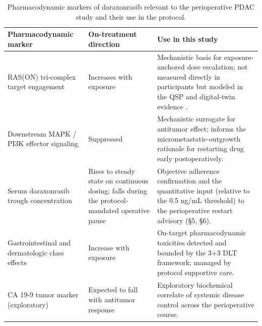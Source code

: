\begin{table}[t]
\centering
\caption{Pharmacodynamic markers of daraxonrasib relevant to the perioperative
PDAC study and their use in the protocol.}
\label{tab:sec07-pd}
\begin{tabularx}{\textwidth}{L{3.7cm} L{2.4cm} Y}
\toprule
\textbf{Pharmacodynamic marker} & \textbf{On-treatment direction} & \textbf{Use in this study} \\
\midrule
RAS(ON) tri-complex target engagement & Increases with exposure & Mechanistic basis for exposure-anchored dose escalation; not measured directly in participants but modeled in the QSP and digital-twin evidence \cite{qspmetpancre}. \\
Downstream MAPK / PI3K effector signaling & Suppressed & Mechanistic surrogate for antitumor effect; informs the micrometastatic-outgrowth rationale for restarting drug early postoperatively. \\
Serum daraxonrasib trough concentration & Rises to steady state on continuous dosing; falls during the protocol-mandated operative pause & Objective adherence confirmation and the quantitative input (relative to the 0.5 ng/mL threshold) to the perioperative restart advisory (\S 5, \S 6). \\
Gastrointestinal and dermatologic class effects & Increase with exposure & On-target pharmacodynamic toxicities detected and bounded by the 3+3 DLT framework; managed by protocol supportive care. \\
CA 19-9 tumor marker (exploratory) & Expected to fall with antitumor response & Exploratory biochemical correlate of systemic disease control across the perioperative course. \\
\bottomrule
\end{tabularx}
\end{table}


